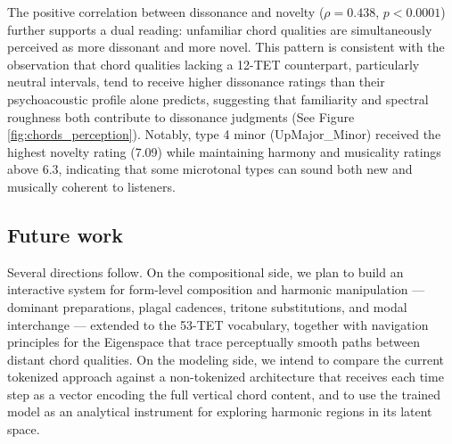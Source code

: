 \documentclass{aimc2026}
\begin{document}
The positive correlation between dissonance and novelty ($\rho = 0.438$, $p < 0.0001$) further supports a dual reading: unfamiliar chord qualities are simultaneously perceived as more dissonant and more novel. This pattern is consistent with the observation that chord qualities lacking a 12-TET counterpart, particularly neutral intervals, tend to receive higher dissonance ratings than their psychoacoustic profile alone predicts, suggesting that familiarity and spectral roughness both contribute to dissonance judgments (See Figure \ref{fig:chords_perception}). Notably, type 4 minor (UpMajor\_Minor) received the highest novelty rating (7.09) while maintaining harmony and musicality ratings above 6.3, indicating that some microtonal types can sound both new and musically coherent to listeners.

\subsection{Future work}

Several directions follow. On the compositional side, we plan to build an interactive system for form-level composition and harmonic manipulation --- dominant preparations, plagal cadences, tritone substitutions, and modal interchange --- extended to the 53-TET vocabulary, together with navigation principles for the Eigenspace that trace perceptually smooth paths between distant chord qualities. On the modeling side, we intend to compare the current tokenized approach against a non-tokenized architecture that receives each time step as a vector encoding the full vertical chord content, and to use the trained model as an analytical instrument for exploring harmonic regions in its latent space.



\FloatBarrier

\end{document}
